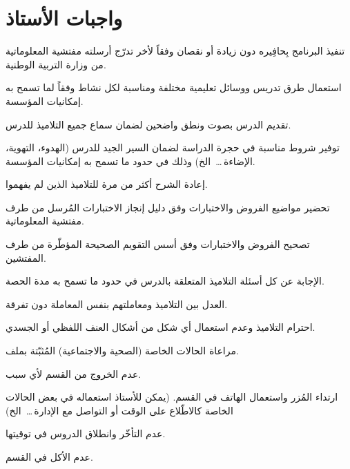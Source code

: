 \documentclass[12pt, a4paper]{article}
\begin{document}
\vspace{0.8cm}
\newpage

\section{واجبات الأستاذ}

\begin{teacherlist}
  \item تنفيذ البرنامج بِحافِيره دون زيادة أو نقصان وفقاً لأخر تدرّج
        أرسلته مفتشية المعلوماتية من وزارة التربية الوطنية.

  \item استعمال طرق تدريس ووسائل تعليمية مختلفة ومناسبة لكل نشاط وفقاً
        لما تسمح به إمكانيات المؤسسة.

  \item تقديم الدرس بصوت ونطق واضحين لضمان سماع جميع التلاميذ للدرس.

  \item توفير شروط مناسبة في حجرة الدراسة لضمان السير الجيد للدرس
        (الهدوء، التهوية، الإضاءة\,\ldots\ الخ) وذلك في حدود ما تسمح به
        إمكانيات المؤسسة.

  \item إعادة الشرح أكثر من مرة للتلاميذ الذين لم يفهموا.

  \item تحضير مواضيع الفروض والاختبارات وفق دليل إنجاز الاختبارات
        المُرسل من طرف مفتشية المعلوماتية.

  \item تصحيح الفروض والاختبارات وفق أسس التقويم الصحيحة المؤطّرة
        من طرف المفتشين.

  \item الإجابة عن كل أسئلة التلاميذ المتعلقة بالدرس في حدود ما تسمح
        به مدة الحصة.

  \item العدل بين التلاميذ ومعاملتهم بنفس المعاملة دون تفرقة.

  \item احترام التلاميذ وعدم استعمال أي شكل من أشكال العنف اللفظي أو
        الجسدي.

  \item مراعاة الحالات الخاصة (الصحية والاجتماعية) المُثبّتة بملف.

  \item عدم الخروج من القسم لأي سبب.

  \item ارتداء المُزر واستعمال الهاتف في القسم. (يمكن للأستاذ استعماله
        في بعض الحالات الخاصة كالاطّلاع على الوقت أو التواصل مع
        الإدارة\,\ldots\ الخ)

  \item عدم التأخّر وانطلاق الدروس في توقيتها.

  \item عدم الأكل في القسم.
\end{teacherlist}
\end{document}
